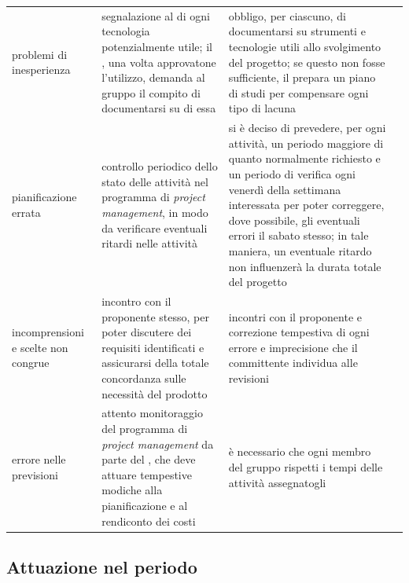 	
\begin{adjustwidth}{-3cm}{-3cm}
\begin{center}
\begin{tabular}{| p{3cm} | p{3.5cm} | p{4cm} | p{3cm} |}

	problemi di inesperienza & segnalazione al \Rx{} di ogni tecnologia potenzialmente utile; il \Rx{}, una volta approvatone l'utilizzo, demanda al gruppo il compito di documentarsi su di essa & obbligo, per ciascuno, di documentarsi su strumenti e tecnologie utili allo svolgimento del progetto; se questo non fosse sufficiente, il \Rx{} prepara un piano di studi per compensare ogni tipo di lacuna \\
	pianificazione errata & controllo periodico dello stato delle attività nel programma di \emph{project management}, in modo da verificare eventuali ritardi nelle attività & si è deciso di prevedere, per ogni attività, un periodo maggiore di quanto normalmente richiesto e un periodo di verifica ogni venerdì della settimana interessata per poter correggere, dove possibile, gli eventuali errori il sabato stesso; in tale maniera, un eventuale ritardo non influenzerà la durata totale del progetto  \\
	incomprensioni e scelte non congrue & incontro con il proponente stesso, per poter discutere dei requisiti identificati e assicurarsi della totale concordanza sulle necessità del prodotto & incontri con il proponente e correzione tempestiva di ogni errore e imprecisione che il committente individua alle revisioni  \\
	errore nelle previsioni & attento monitoraggio del programma di \emph{project management} da parte del \Rx{}, che deve attuare tempestive modiche alla pianificazione e al rendiconto dei costi & è necessario che ogni membro del gruppo rispetti i tempi delle attività assegnatogli  \\
	\hline
\end{tabular}
\end{center}
\end{adjustwidth}


\subsection{Attuazione nel periodo}

